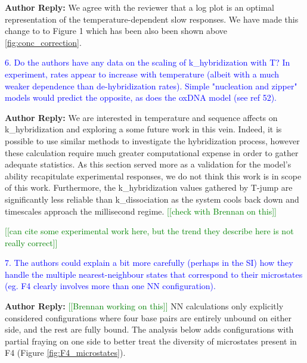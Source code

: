 \documentclass[11pt,a4paper]{letter} %
\newcommand*{\noteg}[1]{\textcolor{green}{[[#1]]}}		%
\begin{document}
\textbf{Author Reply:}   We agree with the reviewer that a log plot is an optimal representation of the temperature-dependent slow responses. We have made this change to to Figure 1 which has been also been shown above \ref{fig:conc_correction}.

\textcolor{blue}{6. Do the authors have any data on the scaling of k\_hybridization with T? In experiment, rates appear to increase with temperature (albeit with a much weaker dependence than de-hybridization rates). Simple "nucleation and zipper" models would predict the opposite, as does the oxDNA model (see ref 52).}

\textbf{Author Reply:}   We are interested in temperature and sequence affects on  k\_hybridization and exploring a some future work in this vein. Indeed, it is possible to use similar methods to investigate the hybridization process, however these calculation require much greater computational expense in order to gather adequate statistics. As this section served more as a validation for the model’s ability recapitulate experimental responses, we do not think this work is in scope of this work. Furthermore, the k\_hybridization values gathered by T-jump are significantly less reliable than k\_dissociation as the system cools back down and timescales approach the millisecond regime. \noteg{check with Brennan on this}

\noteg{can cite some experimental work here, but the trend they describe here is not really correct}

\textcolor{blue}{7. The authors could explain a bit more carefully (perhaps in the SI) how they handle the multiple nearest-neighbour states that correspond to their microstates (eg. F4 clearly involves more than one NN configuration).}

\textbf{Author Reply:}   \noteg{Brennan working on this}  NN calculations only explicitly considered configurations where four base pairs are entirely unbound on either side, and the rest are fully bound. The analysis below adds configurations with partial fraying on one side to better treat the diversity of microstates present in F4 (Figure \ref{fig:F4_microstates}).
\end{document}
